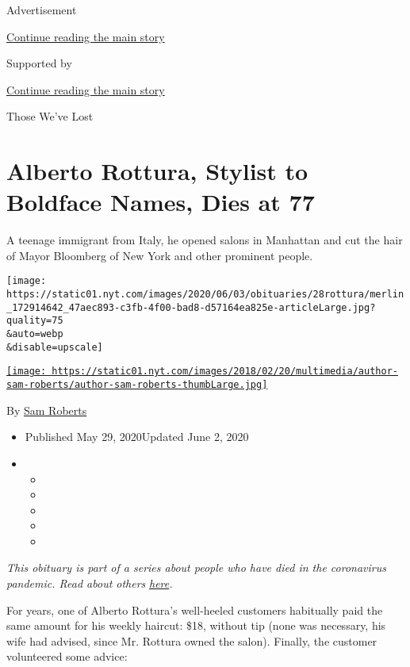 Advertisement

\protect\hyperlink{after-top}{Continue reading the main story}

Supported by

\protect\hyperlink{after-sponsor}{Continue reading the main story}

Those We've Lost

\hypertarget{alberto-rottura-stylist-to-boldface-names-dies-at-77}{%
\section{Alberto Rottura, Stylist to Boldface Names, Dies at
77}\label{alberto-rottura-stylist-to-boldface-names-dies-at-77}}

A teenage immigrant from Italy, he opened salons in Manhattan and cut
the hair of Mayor Bloomberg of New York and other prominent people.

\texttt{[image: https://static01.nyt.com/images/2020/06/03/obituaries/28rottura/merlin\_172914642\_47aec893-c3fb-4f00-bad8-d57164ea825e-articleLarge.jpg?quality=75\\\&auto=webp\\\&disable=upscale]}

\href{https://www.nytimes.com/by/sam-roberts}{\texttt{[image: https://static01.nyt.com/images/2018/02/20/multimedia/author-sam-roberts/author-sam-roberts-thumbLarge.jpg]}}

By \href{https://www.nytimes.com/by/sam-roberts}{Sam Roberts}

\begin{itemize}
\item
  Published May 29, 2020Updated June 2, 2020
\item
  \begin{itemize}
  \item
  \item
  \item
  \item
  \item
  \end{itemize}
\end{itemize}

\emph{This obituary is part of a series about people who have died in
the coronavirus pandemic. Read about others}
\href{https://www.nytimes.com/interactive/2020/obituaries/people-died-coronavirus-obituaries.html}{\emph{here}}\emph{.}

For years, one of Alberto Rottura's well-heeled customers habitually
paid the same amount for his weekly haircut: \$18, without tip (none was
necessary, his wife had advised, since Mr. Rottura owned the salon).
Finally, the customer volunteered some advice:

